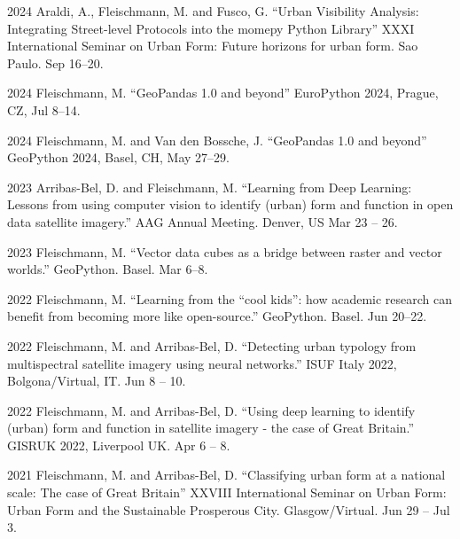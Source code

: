 \documentclass[12pt,a4paper]{report}
\begin{document}
    \begin{tablist}

        \item[2024] \tab{}Araldi, A., Fleischmann, M. and Fusco, G. \enquote{Urban Visibility Analysis: Integrating Street-level Protocols into the momepy Python Library} XXXI International Seminar on Urban Form: Future horizons for urban form. Sao Paulo. \@ Sep 16--20.

        \item[2024] \tab{}Fleischmann, M. \enquote{GeoPandas 1.0 and beyond} EuroPython 2024, Prague, CZ,  \@ Jul 8--14.

        \item[2024] \tab{}Fleischmann, M. and Van den Bossche, J. \enquote{GeoPandas 1.0 and beyond} GeoPython 2024, Basel, CH,  \@ May 27--29.

        \item[2023] \tab{}Arribas-Bel, D. and Fleischmann, M. \enquote{Learning from Deep Learning: Lessons from using computer vision to identify (urban) form and function in open data satellite imagery.} AAG Annual Meeting. Denver, US \@ Mar 23 -- 26.

        \item[2023] \tab{}Fleischmann, M. \enquote{Vector data cubes as a bridge between raster and vector worlds.} GeoPython. Basel. \@ Mar 6--8.

        \item[2022] \tab{}Fleischmann, M. \enquote{Learning from the “cool kids”: how academic research can benefit from becoming more like open-source.} GeoPython. Basel. \@ Jun 20--22.

        \item[2022] \tab{}Fleischmann, M. and Arribas-Bel, D. \enquote{Detecting urban typology from multispectral satellite imagery using neural networks.} ISUF Italy 2022, Bolgona/Virtual, IT. Jun 8 -- 10.

        \item[2022] \tab{}Fleischmann, M. and Arribas-Bel, D. \enquote{Using deep learning to identify (urban) form and function in satellite imagery - the case of Great Britain.} GISRUK 2022, Liverpool UK. Apr 6 -- 8.

        \item[2021] \tab{}Fleischmann, M. and Arribas-Bel, D. \enquote{Classifying urban form at a national scale: The case of Great Britain} XXVIII International Seminar on Urban Form: Urban Form and the Sustainable Prosperous City. Glasgow/Virtual. \@ Jun 29 -- Jul 3.


\end{tablist}
\end{document}
